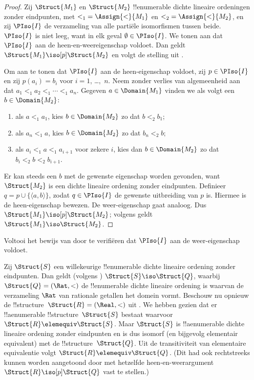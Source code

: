 \documentclass[openany]{memoir}
\begin{document}
\begin{proof}
  Zij $\Struct{M_1}$ en $\Struct{M_2}$ !!{enumerable} dichte lineaire
  ordeningen zonder eindpunten, met ${<_1} = \Assign{<}{M_1}$ en ${<_2} =
  \Assign{<}{M_2}$, en zij $\PIso{I}$ de verzameling van alle partiële
  isomorfismen tussen beide. $\PIso{I}$ is niet leeg, want in elk geval
  $\emptyset \in \PIso{I}$. We tonen aan dat $\PIso{I}$ aan de
  heen-en-weereigenschap voldoet. Dan geldt $\Struct{M_1} \iso[p] \Struct{M_2}$
  en volgt de stelling uit .

  Om aan te tonen dat $\PIso{I}$ aan de heen-eigenschap voldoet, zij $p \in
  \PIso{I}$ en zij $p(a_i) = b_i$ voor $i = 1$, \dots,~$n$. Neem
  zonder verlies van algemeenheid aan dat $a_1 <_1 a_2 <_1 \cdots <_1
  a_n$. Gegeven $a \in \Domain{M_1}$ vinden we als volgt een
  $b \in \Domain{M_2}$:
  \begin{enumerate}
  \item als $a <_1 a_1$, kies $b \in \Domain{M_2}$ zo dat $b <_2
    b_1$;
  \item als $a_n <_1 a$, kies $b \in \Domain{M_2}$ zo dat $b_n <_2 b$;
 \item als $a_i <_1 a <_1 a_{i+1}$ voor zekere $i$, kies dan $b \in
   \Domain{M_2}$ zo dat $b_i <_2 b <_2 b_{i+1}$.
  \end{enumerate}
  Er kan steeds een $b$ met de gewenste eigenschap worden gevonden, want
  $\Struct{M_2}$ is een dichte lineaire ordening zonder eindpunten. Definieer
  $q = p \cup \{ \langle a, b \rangle \}$, zodat $q \in \PIso{I}$ de
  gewenste uitbreiding van $p$ is. Hiermee is de heen-eigenschap
  bewezen. De weer-eigenschap gaat analoog. Dus $\Struct{M_1} \iso[p]
  \Struct{M_2}$; volgens  geldt $\Struct{M_1} \iso
  \Struct{M_2}$.
\end{proof}

\begin{prob}
  Voltooi het bewijs van  door
  te verifiëren dat $\PIso{I}$ aan de weer-eigenschap voldoet.
\end{prob}

\begin{rem}
  Zij $\Struct{S}$ een willekeurige !!{enumerable} dichte lineaire ordening zonder
  eindpunten. Dan geldt (volgens ) $\Struct{S} \iso
  \Struct{Q}$, waarbij $\Struct{Q} = (\Rat, <)$ de !!{enumerable}
  dichte lineaire ordening is waarvan de verzameling $\Rat$ van rationale getallen
  het domein vormt. Beschouw nu opnieuw de !!{structure}~$\Struct{R} =
  (\Real, <)$ uit . We hebben gezien dat er
  !!a{enumerable} !!{structure}~$\Struct{S}$ bestaat waarvoor $\Struct{R}
  \elemequiv \Struct{S}$. Maar $\Struct{S}$ is !!a{enumerable} dichte
  lineaire ordening zonder eindpunten en is dus isomorf (en bijgevolg
  elementair equivalent) met de !!{structure}~$\Struct{Q}$. Uit de
  transitiviteit van elementaire equivalentie volgt $\Struct{R} \elemequiv
  \Struct{Q}$. (Dit had ook rechtstreeks kunnen worden aangetoond door met
  hetzelfde heen-en-weerargument $\Struct{R} \iso[p] \Struct{Q}$ vast te
  stellen.)
\end{rem}
\endgroup
\OLEndChapterHook
\end{document}
